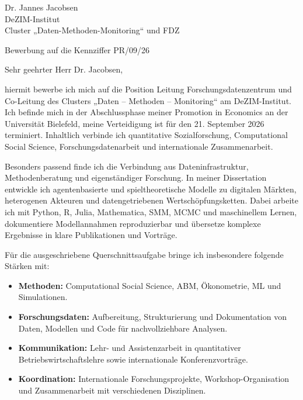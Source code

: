 \documentclass[11pt]{article}
\begin{document}
\vspace{0.1cm}

\noindent
Dr. Jannes Jacobsen \\
DeZIM-Institut \\
Cluster „Daten-Methoden-Monitoring“ und FDZ \\

\vspace{0.1cm}

\noindent
Bewerbung auf die Kennziffer PR/09/26 \\

\vspace{0.05cm}

\noindent Sehr geehrter Herr Dr. Jacobsen,

hiermit bewerbe ich mich auf die Position Leitung Forschungsdatenzentrum und Co-Leitung des Clusters „Daten – Methoden – Monitoring“ am DeZIM-Institut. Ich befinde mich in der Abschlussphase meiner Promotion in Economics an der Universität Bielefeld, meine Verteidigung ist für den 21. September 2026 terminiert. Inhaltlich verbinde ich quantitative Sozialforschung, Computational Social Science, Forschungsdatenarbeit und internationale Zusammenarbeit.

Besonders passend finde ich die Verbindung aus Dateninfrastruktur, Methodenberatung und eigenständiger Forschung. In meiner Dissertation entwickle ich agentenbasierte und spieltheoretische Modelle zu digitalen Märkten, heterogenen Akteuren und datengetriebenen Wertschöpfungsketten. Dabei arbeite ich mit Python, R, Julia, Mathematica, SMM, MCMC und maschinellem Lernen, dokumentiere Modellannahmen reproduzierbar und übersetze komplexe Ergebnisse in klare Publikationen und Vorträge.

Für die ausgeschriebene Querschnittsaufgabe bringe ich insbesondere folgende Stärken mit:

\begin{itemize}
    \item \textbf{Methoden:} Computational Social Science, ABM, Ökonometrie, ML und Simulationen.
    \item \textbf{Forschungsdaten:} Aufbereitung, Strukturierung und Dokumentation von Daten, Modellen und Code für nachvollziehbare Analysen.
    \item \textbf{Kommunikation:} Lehr- und Assistenzarbeit in quantitativer Betriebswirtschaftslehre sowie internationale Konferenzvorträge.
    \item \textbf{Koordination:} Internationale Forschungsprojekte, Workshop-Organisation und Zusammenarbeit mit verschiedenen Disziplinen.
\end{itemize}
\end{document}

